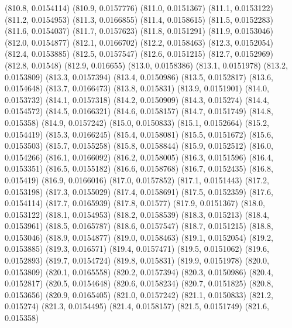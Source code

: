 {					(810.8, 0.0154114)
					(810.9, 0.0157776)
					(811.0, 0.0151367)
					(811.1, 0.0153122)
					(811.2, 0.0154953)
					(811.3, 0.0166855)
					(811.4, 0.0158615)
					(811.5, 0.0152283)
					(811.6, 0.0154037)
					(811.7, 0.0157623)
					(811.8, 0.0151291)
					(811.9, 0.0153046)
					(812.0, 0.0154877)
					(812.1, 0.0166702)
					(812.2, 0.0158463)
					(812.3, 0.0152054)
					(812.4, 0.0153885)
					(812.5, 0.0157547)
					(812.6, 0.0151215)
					(812.7, 0.0152969)
					(812.8, 0.01548)
					(812.9, 0.016655)
					(813.0, 0.0158386)
					(813.1, 0.0151978)
					(813.2, 0.0153809)
					(813.3, 0.0157394)
					(813.4, 0.0150986)
					(813.5, 0.0152817)
					(813.6, 0.0154648)
					(813.7, 0.0166473)
					(813.8, 0.015831)
					(813.9, 0.0151901)
					(814.0, 0.0153732)
					(814.1, 0.0157318)
					(814.2, 0.0150909)
					(814.3, 0.015274)
					(814.4, 0.0154572)
					(814.5, 0.0166321)
					(814.6, 0.0158157)
					(814.7, 0.0151749)
					(814.8, 0.015358)
					(814.9, 0.0157242)
					(815.0, 0.0150833)
					(815.1, 0.0152664)
					(815.2, 0.0154419)
					(815.3, 0.0166245)
					(815.4, 0.0158081)
					(815.5, 0.0151672)
					(815.6, 0.0153503)
					(815.7, 0.0155258)
					(815.8, 0.0158844)
					(815.9, 0.0152512)
					(816.0, 0.0154266)
					(816.1, 0.0166092)
					(816.2, 0.0158005)
					(816.3, 0.0151596)
					(816.4, 0.0153351)
					(816.5, 0.0155182)
					(816.6, 0.0158768)
					(816.7, 0.0152435)
					(816.8, 0.015419)
					(816.9, 0.0166016)
					(817.0, 0.0157852)
					(817.1, 0.0151443)
					(817.2, 0.0153198)
					(817.3, 0.0155029)
					(817.4, 0.0158691)
					(817.5, 0.0152359)
					(817.6, 0.0154114)
					(817.7, 0.0165939)
					(817.8, 0.01577)
					(817.9, 0.0151367)
					(818.0, 0.0153122)
					(818.1, 0.0154953)
					(818.2, 0.0158539)
					(818.3, 0.015213)
					(818.4, 0.0153961)
					(818.5, 0.0165787)
					(818.6, 0.0157547)
					(818.7, 0.0151215)
					(818.8, 0.0153046)
					(818.9, 0.0154877)
					(819.0, 0.0158463)
					(819.1, 0.0152054)
					(819.2, 0.0153885)
					(819.3, 0.016571)
					(819.4, 0.0157471)
					(819.5, 0.0151062)
					(819.6, 0.0152893)
					(819.7, 0.0154724)
					(819.8, 0.015831)
					(819.9, 0.0151978)
					(820.0, 0.0153809)
					(820.1, 0.0165558)
					(820.2, 0.0157394)
					(820.3, 0.0150986)
					(820.4, 0.0152817)
					(820.5, 0.0154648)
					(820.6, 0.0158234)
					(820.7, 0.0151825)
					(820.8, 0.0153656)
					(820.9, 0.0165405)
					(821.0, 0.0157242)
					(821.1, 0.0150833)
					(821.2, 0.015274)
					(821.3, 0.0154495)
					(821.4, 0.0158157)
					(821.5, 0.0151749)
					(821.6, 0.015358)
}
